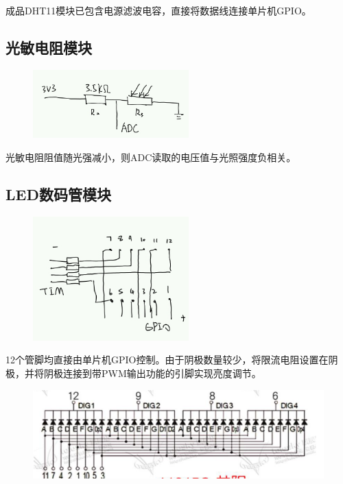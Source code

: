 \documentclass[a4paper,11pt,UTF8]{ctexart}
\newcommand{\bottomcaption}{%
\setlength{\abovecaptionskip}{6bp}%
\setlength{\belowcaptionskip}{6bp}%
\caption}
\newcommand{\xiaowuhao}{\fontsize{9bp}{9bp}\selectfont}   %
\begin{document}
成品DHT11模块已包含电源滤波电容，直接将数据线连接单片机GPIO。

\subsection{光敏电阻模块}

\begin{figure}[!htbp]
    \centering
    \includegraphics[width=6cm]{image7.png}
    \bottomcaption{\xiaowuhao{光敏电阻模块原理图}}
\end{figure}

光敏电阻阻值随光强减小，则ADC读取的电压值与光照强度负相关。

\subsection{LED数码管模块}

\begin{figure}[!htbp]
    \centering
    \includegraphics[width=6cm]{image8.png}
    \bottomcaption{\xiaowuhao{LED数码管模块原理图}}
\end{figure}

12个管脚均直接由单片机GPIO控制。由于阴极数量较少，将限流电阻设置在阴极，并将阴极连接到带PWM输出功能的引脚实现亮度调节。

\begin{figure}[!htbp]
    \centering
    \includegraphics[width=\textwidth]{image9.png}
    \bottomcaption{\xiaowuhao{数码管内部原理图}}
\end{figure}
\end{document}
